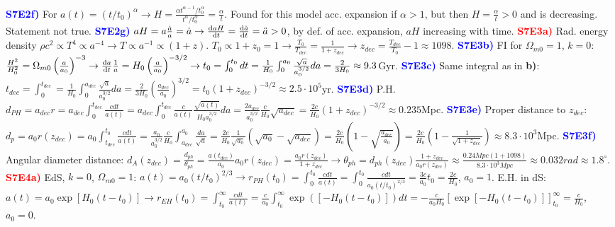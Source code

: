 \documentclass[landscape, a4paper,1pt,english]{article}
\begin{document}
{{{\begin{multicols}{5}
\textcolor{blue}{\textbf{S7E2f)}} For $a(t) = (t/t_0)^\alpha\rightarrow H = \frac{\alpha t^{\alpha -1}/t_0^\alpha}{t^\alpha/t_0^\alpha} = \frac{\alpha}{t}$. Found for this model acc. expansion if $\alpha >1$, but then $H = \frac{\alpha}{t}>0$ and is decreasing. Statement not true.
\textcolor{blue}{\textbf{S7E2g)}} $aH = a\frac{\dot{a}}{a} = \dot{a}\rightarrow \dv{aH}{t} = \dv{\dot{a}}{t} = \ddot{a}>0$, by def. of acc. expansion, $aH$ increasing with time.
\textcolor{red}{\textbf{S7E3a)}} Rad. energy density $\rho c^2\propto T^4\propto a^{-4}\rightarrow T\propto a^{-1}\propto(1+z)$. $T_0 \propto 1+z_0 = 1\rightarrow \frac{T_0}{T_{dec}} = \frac{1}{1+z_{dec}}\rightarrow z_{dec} = \frac{T_{dec}}{T_0} - 1 \approx 1098$.
\textcolor{blue}{\textbf{S7E3b)}} FI for $\Omega_{m0} = 1$, $k=0$: $\frac{H^2}{H_0^2} = \Omega_{m0}\left(\frac{a}{a_0}\right)^{-3}\rightarrow \dv{a}{t}\frac{1}{a} = H_0\left(\frac{a}{a_0}\right)^{-3/2}\rightarrow t_0 = \int_{0}^{t_0} dt = \frac{1}{H_0}\int_{0}^{a_0}\frac{\sqrt{a}}{a_0^{3/2}}da = \frac{2}{3H_0}\approx 9.3$Gyr.
\textcolor{blue}{\textbf{S7E3c)}} Same integral as in \textbf{b)}: $t_{dec} = \int_{0}^{t_{dec}} = \frac{1}{H_0}\int_{0}^{a_{dec}}\frac{\sqrt{a}}{a_0^{3/2}}da = \frac{2}{3H_0}\left(\frac{a_{dec}}{a_0}\right)^{3/2} = t_0(1+z_{dec})^{-3/2}\approx 2.5\cdot 10^5$yr.
\textcolor{blue}{\textbf{S7E3d)}} P.H. $d_{PH} = a_{dec}r = a_{dec}\int_{0}^{t_{dec}}\frac{c dt}{a(t)}= a_{dec}\int_{0}^{t_{dec}}\frac{c}{a(t)}\frac{\sqrt{a(t)}}{H_0a_0^{3/2}}da = \frac{2a_{dec}}{a_0^{3/2}}\frac{c}{H_0}\sqrt{a_{dec}} = \frac{2c}{H_0}(1+z_{dec})^{-3/2}\approx0.235$Mpc.
\textcolor{blue}{\textbf{S7E3e)}} Proper distance to $z_{dec}$: $d_{p} = a_{0}r(z_{dec}) = a_{0}\int_{t_{dec}}^{t_{0}}\frac{c dt}{a(t)}= \frac{a_0}{a_0^{3/2}}\frac{c}{H_0}\int_{a_{dec}}^{a_0}\frac{da}{\sqrt{a}} = \frac{2c}{H_0}\frac{1}{\sqrt{a_0}}(\sqrt{a_0} - \sqrt{a_{dec}}) = \frac{2c}{H_0}(1-\sqrt{\frac{a_{dec}}{a_0}}) = \frac{2c}{H_0}(1-\frac{1}{\sqrt{1+z_{dec}}})\approx8.3\cdot10^3$Mpc.  
\textcolor{blue}{\textbf{S7E3f)}} Angular diameter distance:
$d_A(z_{dec}) = \frac{d_{ph}}{\theta_{ph}} = \frac{a(t_{dec})}{a_0}a_0r(z_{dec})=\frac{a_0r(z_{dec})}{1+z_{dec}}\rightarrow\theta_{ph} = d_{ph}(z_{dec})\frac{1+z_{dec}}{a_0 r(z_{dec})}\approx \frac{0.24Mpc(1+1098)}{8.3\cdot10^3 Mpc}\approx0.032 rad \approx 1.8^\circ$.
\textcolor{red}{\textbf{S7E4a)}} EdS, $k = 0$, $\Omega_{m0}=1$: $a(t) = a_0\left(t/t_0\right)^{2/3}\rightarrow r_{PH}(t_0) = \int_{0}^{t_0}\frac{cdt}{a(t)} = \int_{0}^{t_0}\frac{cdt}{a_0(t/t_0)^{2/3}} = \frac{3c}{a_0}t_0 = \frac{2c}{H_0}$, $a_0 = 1$. E.H. in dS: $a(t) = a_0\exp[H_0(t - t_0)]\rightarrow r_{EH}(t_0) = \int_{t_0}^{\infty}\frac{cdt}{a(t)} = \frac{c}{a_0}\int_{t_0}^{\infty} \exp([-H_0(t-t_0)])dt = -\frac{c}{a_0H_0}\left[\exp[-H_0(t-t_0)]\right]_{t_0}^\infty = \frac{c}{H_0}$, $a_0 = 0$.

\end{multicols}}}}
\end{document}
